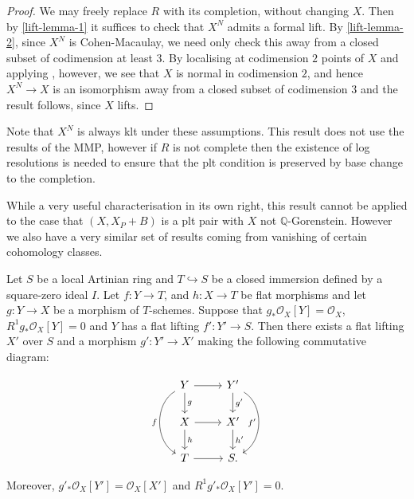 \documentclass[a4paper,12pt]{book}
\newcommand{\ox}{\mathcal{O}_{X}}
\begin{document}
\begin{proof}

	We may freely replace $R$ with its completion, without changing $X$. Then by \autoref{lift-lemma-1} it suffices to check that $X^{N}$ admits a formal lift. By \autoref{lift-lemma-2}, since $X^{N}$ is Cohen-Macaulay, we need only check this away from a closed subset of codimension at least $3$. By localising at codimension $2$ points of $X$ and applying \cite{}, however, we see that $X$ is normal in codimension $2$, and hence $X^{N} \to X$ is an isomorphism away from a closed subset of codimension $3$ and the result follows, since $X$ lifts.
	
\end{proof}

Note that $X^{N}$ is always klt under these assumptions. This result does not use the results of the MMP, however if $R$ is not complete then the existence of log resolutions is needed to ensure that the plt condition is preserved by base change to the completion.

While a very useful characterisation in its own right, this result cannot be applied to the case that $(X,X_{P}+B)$ is a plt pair with $X$ not $\mathbb{Q}$-Gorenstein. However we also have a very similar set of results coming from vanishing of certain cohomology classes. 

\begin{proposition}\label{push-lift}
	Let $S$ be a local Artinian ring and $T \hookrightarrow S$ be a closed immersion defined by a square-zero ideal $I$.  Let $f\colon Y \to T$, and $h\colon X \to T$ be flat morphisms and let $g\colon Y \to X$ be a morphism of $T$-schemes. 
	Suppose that $g_{*} \ox[Y]=\ox$, $R^{1}g_{*} \ox[Y] = 0$ and $Y$ has a flat lifting $f' \colon Y' \to S$. Then there exists a flat lifting $X'$ over $S$ and a morphism $g' \colon Y' \to X'$ making the following commutative diagram:
	
	\[\begin{tikzcd}
	Y \arrow[r] \arrow[d, "g"]  \arrow[bend right=60,swap, "f"]{dd}
	& Y' \arrow[d, "g'"] \arrow[bend left=60,swap, "f'"]{dd} \\
	X \arrow[d, "h"] \arrow[r] & X' \arrow[d, "h'"] \\
	T \arrow[r]                        & S    .                     
	\end{tikzcd}\]
	
	Moreover,  $g'_{*} \ox[Y']=\ox[X']$ and $R^{1}g'_{*} \ox[Y'] = 0$.
\end{proposition}
\end{document}
